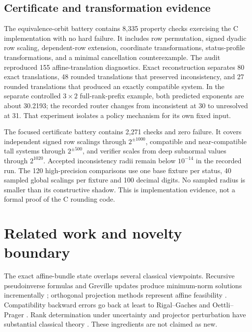 \documentclass[11pt]{article}
\theoremstyle{definition}
\begin{document}
\subsection{Certificate and transformation evidence}
The equivalence-orbit battery contains 8,335 property checks exercising the C
implementation with no hard failure. It includes row permutation, signed
dyadic row scaling, dependent-row
extension, coordinate transformations, status-profile transformations, and a
minimal cancellation counterexample. The audit reproduced 155 affine-translation diagnostics. Exact reconstruction separates 80 exact translations, 48 rounded translations that preserved inconsistency, and 27 rounded translations that produced an exactly compatible system. In the separate controlled $3\times2$ full-rank-prefix example, both predicted exponents are about 30.2193; the recorded router changes from inconsistent at 30 to unresolved at 31. That experiment isolates a policy mechanism for its own fixed input.

The focused certificate battery contains 2,271 checks and zero failure. It
covers independent signed row scalings through $2^{\pm1000}$, compatible and
near-compatible tall systems through $2^{\pm500}$, and verifier scales from
deep subnormal values through $2^{1020}$. Accepted inconsistency radii remain
below $10^{-14}$ in the recorded run. The 120 high-precision comparisons use one base fixture per status, 40 sampled global scalings per fixture and 100 decimal digits. No sampled radius is smaller than its constructive shadow.
This is implementation evidence, not a formal proof of the C rounding code.

\section{Related work and novelty boundary}\label{sec:related}
The exact affine-bundle state overlaps several classical viewpoints. Recursive pseudoinverse formulas and Greville updates produce minimum-norm solutions incrementally \citep{Greville1960,BenIsraelGreville2003}; orthogonal projection methods represent affine feasibility \citep{Plesnik2007}. Compatibility backward errors go back at least to Rigal--Gaches and Oettli--Prager \citep{RigalGaches1967,OettliPrager1964}. Rank determination under uncertainty and projector perturbation have substantial classical theory \citep{Manteuffel1981,Stewart1977}. These ingredients are not claimed as new.
\end{document}
